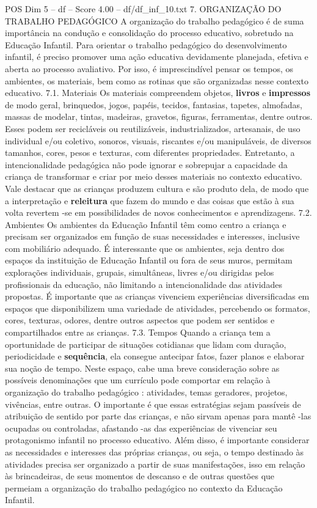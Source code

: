 \begin{textsample}{POS Dim 5 – df – Score 4.00 – df/df\_inf\_10.txt}  \label{ex:f5_pos_159}
7.
ORGANIZAÇÃO DO TRABALHO PEDAGÓGICO A organização do trabalho pedagógico é de suma importância na condução e consolidação do processo educativo, sobretudo na Educação Infantil.
Para orientar o trabalho pedagógico do desenvolvimento infantil, é preciso promover uma ação educativa devidamente planejada, efetiva e aberta ao processo avaliativo.
Por isso, é imprescindível pensar os tempos, os ambientes, os materiais, bem como as rotinas que são organizadas nesse contexto educativo. 7.1.
Materiais Os materiais compreendem objetos, \textbf{livros} e \textbf{impressos} de modo geral, brinquedos, jogos, papéis, tecidos, fantasias, tapetes, almofadas, massas de modelar, tintas, madeiras, gravetos, figuras, ferramentas, dentre outros.
Esses podem ser recicláveis ou reutilizáveis, industrializados, artesanais, de uso individual e/ou coletivo, sonoros, visuais, riscantes e/ou manipuláveis, de diversos tamanhos, cores, pesos e texturas, com diferentes propriedades.
Entretanto, a intencionalidade pedagógica não pode ignorar e sobrepujar a capacidade da criança de transformar e criar por meio desses materiais no contexto educativo.
Vale destacar que as crianças produzem cultura e são produto dela, de modo que a interpretação e \textbf{releitura} que fazem do mundo e das coisas que estão à sua volta revertem -se em possibilidades de novos conhecimentos e aprendizagens. 7.2.
Ambientes Os ambientes da Educação Infantil têm como centro a criança e precisam ser organizados em função de suas necessidades e interesses, inclusive com mobiliário adequado.
É interessante que os ambientes, seja dentro dos espaços da instituição de Educação Infantil ou fora de seus muros, permitam explorações individuais, grupais, simultâneas, livres e/ou dirigidas pelos profissionais da educação, não limitando a intencionalidade das atividades propostas.
É importante que as crianças vivenciem experiências diversificadas em espaços que disponibilizem uma variedade de atividades, percebendo os formatos, cores, texturas, odores, dentre outros aspectos que podem ser sentidos e compartilhados entre as crianças. 7.3.
Tempos Quando a criança tem a oportunidade de participar de situações cotidianas que lidam com duração, periodicidade e \textbf{sequência}, ela consegue antecipar fatos, fazer planos e elaborar sua noção de tempo.
Neste espaço, cabe uma breve consideração sobre as possíveis denominações que um currículo pode comportar em relação à organização do trabalho pedagógico : atividades, temas geradores, projetos, vivências, entre outras.
O importante é que essas estratégias sejam passíveis de atribuição de sentido por parte das crianças, e não sirvam apenas para mantê -las ocupadas ou controladas, afastando -as das experiências de vivenciar seu protagonismo infantil no processo educativo.
Além disso, é importante considerar as necessidades e interesses das próprias crianças, ou seja, o tempo destinado às atividades precisa ser organizado a partir de suas manifestações, isso em relação às brincadeiras, de seus momentos de descanso e de outras questões que permeiam a organização do trabalho pedagógico no contexto da Educação Infantil.

\end{textsample}
